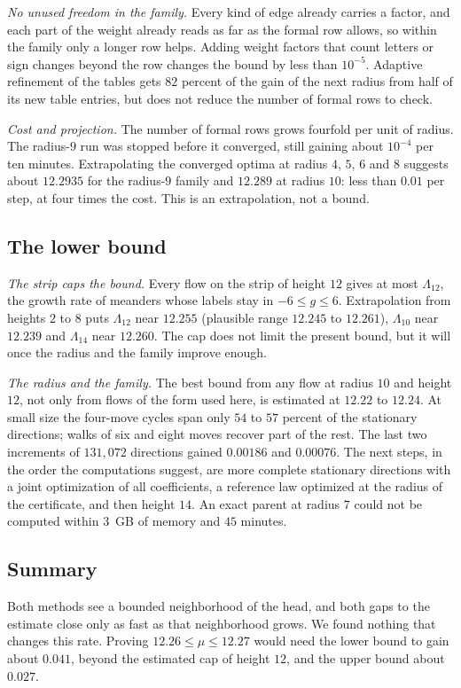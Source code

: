 \emph{No unused freedom in the family.} Every kind of edge already carries a factor, and each part of the weight
already reads as far as the formal row allows, so within the family only a longer row helps. Adding weight factors
that count letters or sign changes beyond the row changes the bound by less than $10^{-5}$. Adaptive refinement of the
tables gets $82$ percent of the gain of the next radius from half of its new table entries, but does not reduce the
number of formal rows to check.

\emph{Cost and projection.} The number of formal rows grows fourfold per unit of radius. The radius-$9$ run was stopped
before it converged, still gaining about $10^{-4}$ per ten minutes. Extrapolating the converged optima at radius $4$,
$5$, $6$ and $8$ suggests about $12.2935$ for the radius-$9$ family and $12.289$ at radius $10$: less than $0.01$ per
step, at four times the cost. This is an extrapolation, not a bound.

\subsection{The lower bound}

\emph{The strip caps the bound.} Every flow on the strip of height $12$ gives at most $\Lambda_{12}$, the growth rate
of meanders whose labels stay in $-6\le g\le6$. Extrapolation from heights $2$ to $8$ puts $\Lambda_{12}$
near $12.255$ (plausible range $12.245$ to $12.261$), $\Lambda_{10}$ near $12.239$ and $\Lambda_{14}$ near $12.260$.
The cap does not limit the present bound, but it will once the radius and the family improve enough.

\emph{The radius and the family.} The best bound from any flow at radius $10$ and height $12$, not only from flows
of the form used here, is estimated at $12.22$ to $12.24$. At small size the four-move cycles span only $54$ to $57$ percent of the stationary directions; walks of six
and eight moves recover part of the rest. The last two increments of $131{,}072$ directions gained $0.00186$ and
$0.00076$.
The next steps, in the order the computations suggest, are more complete stationary directions with a joint
optimization of all coefficients, a reference law optimized at the radius of the certificate, and then height $14$.
An exact parent at radius $7$ could not be computed within $3$~GB of memory and $45$ minutes.

\subsection{Summary}

Both methods see a bounded neighborhood of the head, and both gaps to the estimate close only as fast as that
neighborhood grows. We found nothing that changes this rate. Proving $12.26\le\mu\le12.27$ would need the lower bound to gain about $0.041$,
beyond the estimated cap of height $12$, and the upper bound about $0.027$.
